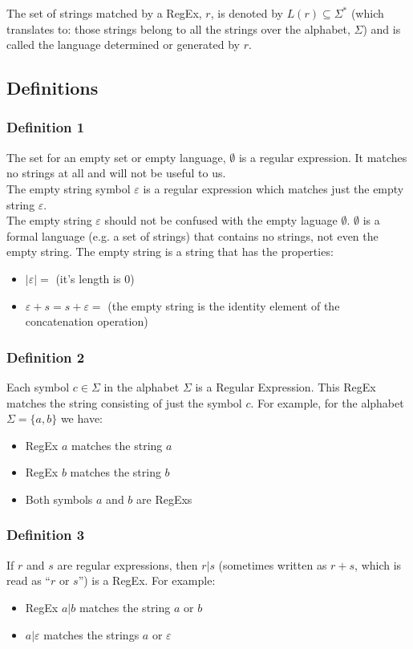 The set of strings matched by a RegEx, $r$, is denoted by $L(r) \subseteq \Sigma^*$ (which translates to: those strings belong to all the strings over the alphabet, $\Sigma$) and is called the language determined or generated by $r$. 

\subsection{Definitions}
\subsubsection{Definition 1}
The set for an empty set or empty language, $\emptyset$ is a regular expression. It matches no strings at all and will not be useful to us.\\

The empty string symbol $\varepsilon$ is a regular expression which matches just the empty string $\varepsilon$.\\

The empty string $\varepsilon$ should not be confused with the empty laguage $\emptyset$. $\emptyset$ is a formal language (e.g. a set of strings) that contains no strings, not even the empty string. The empty string is a string that has the properties:
\begin{itemize}
    \item $|\varepsilon| = $ (it's length is 0)
    \item $\varepsilon + s = s + \varepsilon = $ (the empty string is the identity element of the concatenation operation)
\end{itemize}

\subsubsection{Definition 2}
Each symbol $c \in \Sigma$ in the alphabet $\Sigma$ is a Regular Expression. This RegEx matches the string consisting of just the symbol $c$. For example, for the alphabet $\Sigma = \{a, b\}$ we have:
\begin{itemize}
    \item RegEx $a$ matches the string $a$
    \item RegEx $b$ matches the string $b$
    \item Both symbols $a$ and $b$ are RegExs
\end{itemize}

\subsubsection{Definition 3}
If $r$ and $s$ are regular expressions, then $r | s$ (sometimes written as $r+s$, which is read as ``$r$ or $s$'') is a RegEx. For example:
\begin{itemize}
    \item RegEx $a|b$ matches the string $a$ or $b$
    \item $a|\varepsilon$ matches the strings $a$ or $\varepsilon$
\end{itemize}

